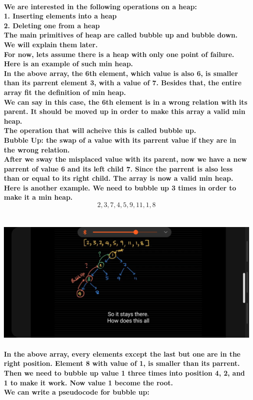 \documentclass{article}
\begin{document}
\paragraph{We are interested in the following operations on a heap:\\
1. Inserting elements into a heap\\
2. Deleting one from a heap\\
The main primitives of heap are called bubble up and bubble down. We will explain them later.\\
For now, lets assume there is a heap with only one point of failure. Here is an example of such min heap.\\
In the above array, the 6th element, which value is also 6, is smaller than its parrent element 3, with a value of 7. Besides that, the entire array fit the definition of min heap.\\
We can say in this case, the 6th element is in a wrong relation with its parent. It should be moved up in order to make this array a valid min heap.\\
The operation that will acheive this is called bubble up.\\
Bubble Up: the swap of a value with its parrent value if they are in the wrong relation.\\
After we sway the misplaced value with its parent, now we have a new parrent of value 6 and its left child 7. Since the parrent is also less than or equal to its right child. The array is now a valid min heap.\\
Here is another example. We need to bubble up 3 times in order to make it a min heap.\\
\[2,3,7,4,5,9,11,1,8\]\\}


\includegraphics[width=\textwidth]{bubbleup}



\paragraph{In the above array, every elements except the last but one are in the right position. Element 8 with value of 1, is smaller than its parrent.\\
Then we need to bubble up value 1 three times into position 4, 2, and 1 to make it work. Now value 1 become the root.\\
We can write a pseudocode for bubble up:\\}
\end{document}
